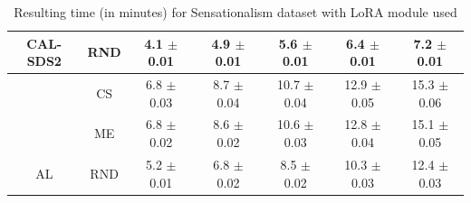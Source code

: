 \begin{table}[htbp]
\begin{tabular*}{\linewidth}{c|c|@{\extracolsep{\fill}}ccccc}
\multirow{-3}{*}{\raggedright\arraybackslash CAL-SDS2} & RND & 4.1 $\pm$ {\small 0.01} & 4.9 $\pm$ {\small 0.01} & 5.6 $\pm$ {\small 0.01} & 6.4 $\pm$ {\small 0.01} & 7.2 $\pm$ {\small 0.01}\\
\midrule
 & CS & 6.8 $\pm$ {\small 0.03} & 8.7 $\pm$ {\small 0.04} & 10.7 $\pm$ {\small 0.04} & 12.9 $\pm$ {\small 0.05} & 15.3 $\pm$ {\small 0.06}\\

 & ME & 6.8 $\pm$ {\small 0.02} & 8.6 $\pm$ {\small 0.02} & 10.6 $\pm$ {\small 0.03} & 12.8 $\pm$ {\small 0.04} & 15.1 $\pm$ {\small 0.05}\\

\multirow{-3}{*}{\raggedright\arraybackslash AL} & RND & 5.2 $\pm$ {\small 0.01} & 6.8 $\pm$ {\small 0.02} & 8.5 $\pm$ {\small 0.02} & 10.3 $\pm$ {\small 0.03} & 12.4 $\pm$ {\small 0.03}\\
\bottomrule
\end{tabular*}
\caption{Resulting time (in minutes) for Sensationalism dataset with LoRA module used}
\label{tab:time_full_sensation_10_lora}
\end{table}
